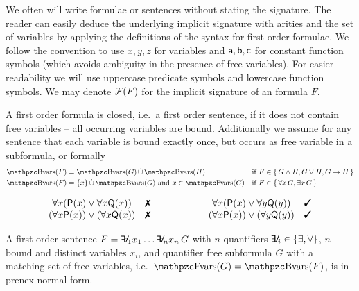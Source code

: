 We often will write formulae or sentences
without stating the signature.
The reader can easily deduce the underlying {\myem implicit} signature with arities
and the set of variables by applying the definitions of the syntax for first order formulae.
We follow the convention to use $x,y,z$ for variables
and $\mathsf{a},\mathsf{b},\mathsf{c}$ for constant function symbols
(which avoids ambiguity in the presence of free variables).
For easier readability we will use uppercase predicate symbols and lowercase function symbols.
We may denote $\mathcal{F}(F)$ for the implicit signature of an formula $F$.

\begin{definition}\label{def:fof:closed}\label{def:fof:sentence}
	A first order formula is closed, i.e.~a first order {\myem sentence},
	if it does not contain free variables -- all occurring variables are bound.
	Additionally we assume for any sentence
	that each variable is bound exactly once,
	but occurs as free variable in a subformula,
	or formally
	\begin{align*}
	\bvar(F) &= \bvar(G)\disjointunion\bvar(H)
	 &&\text{if } F \in\{\,G\land H,G\lor H,G\limp H\,\}
	\\
	\bvar(F) &= \{x\}\disjointunion\bvar(G)\text{ and } x\in\fvar(G)
	&&\text{if }F \in\{\, \forall x\,G, \exists x\,G\,\}
\end{align*}
\end{definition}

\begin{example}
	\[
	\begin{array}{clccl}
		\forall x ({\mP(x) \lor \forall x {\mQ(x)}}) &
		\text{\xmark}
		&\qquad\qquad
		&
		\forall x ({\mP(x) \lor \forall y {\mQ(y)}}) &
		\text{\cmark}
		\\
		(\forall x {\mP(x)}) \lor (\forall x {\mQ(x)}) &
		\text{\xmark}
		&&
		(\forall x {\mP(x)}) \lor (\forall y {\mQ(y)}) &
		\text{\cmark}
	\end{array}
	\]

\end{example}

\begin{definition}[\PNF]
	A first order sentence $F = \quantify_1 x_1 \ldots \quantify_n x_n\, G$
	with $n$ quantifiers $\quantify_i \in \{\exists,\forall\}$,
	$n$ bound and distinct variables $x_i$,
	and quantifier free subformula $G$ with
	a matching set of free variables, i.e.~$\fvar(G) = \bvar(F)$,
	is in {\myem prenex normal form}.
\end{definition}


